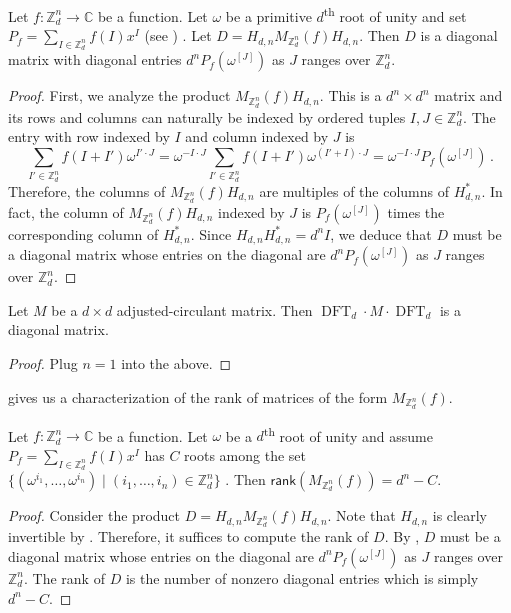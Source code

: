 \documentclass{toc}
\renewcommand\Z{{\mathbb{Z}}}
\renewcommand\C{{\mathbb{C}}}
\newcommand\rank{\textsf{rank}}
\newcommand{\ts}{\textsuperscript}
\DeclareMathOperator{\DFT}{DFT}
\begin{document}
\begin{claim} \label{Hadamard_diagonalization}
Let $f: \Z_d^n \rightarrow \C$ be a function.  Let $\omega$ be a %
primitive  %
%
$d$\ts{th}
%
root of unity and set $P_f = \sum_{I \in \Z_d^n} f(I)x^I$ %
(see )%
.  Let $D = H_{d,n}M_{\Z_d^n}(f)H_{d,n}$.  Then $D$ is a diagonal matrix with diagonal entries $d^nP_f(\omega^{[J]})$ as $J$ ranges over $\Z_d^n$.
\end{claim}
\begin{proof}
First, we analyze the product $M_{\Z_d^n}(f)H_{d,n}$.  This is a $d^n \times d^n$ matrix and its rows and columns can naturally be indexed by ordered tuples $I,J \in \Z_d^n$.  The entry with row indexed by $I$ and column indexed by $J$ is
\[
\sum_{I' \in \Z_d^n} f(I + I')\omega^{I' \cdot J} = \omega^{-I \cdot J}\sum_{I' \in \Z_d^n} f(I + I')\omega^{(I'+I) \cdot J} = \omega^{-I \cdot J} P_f(\omega^{[J]}) \,.
\]
Therefore, the columns of $M_{\Z_d^n}(f)H_{d,n}$ are multiples of the columns of $H_{d,n}^*$.  In fact, the column of $M_{\Z_d^n}(f)H_{d,n}$ indexed by $J$ is $P_f(\omega^{[J]})$ times the corresponding column of $H_{d,n}^*$.  Since $H_{d,n}H_{d,n}^* = d^nI$, %
we deduce that %
$D$ must be a diagonal matrix whose entries on the diagonal are $d^nP_f(\omega^{[J]})$ as $J$ ranges over $\Z_d^n$. 
\end{proof}

\begin{claim}\label{Fourier_diagonalization}
Let $M$ be a $d \times d$ adjusted-circulant matrix.  Then %
$\DFT_d \cdot  M  \cdot \DFT_d$ %
is a diagonal matrix.
\end{claim}
\begin{proof}
Plug $n=1$ into the above.
\end{proof}



 gives us a characterization of the rank of matrices of the form $M_{\Z_d^n}(f)$.
\begin{claim} \label{rankcomp}
Let $f: \Z_d^n \rightarrow \C$ be a function.  Let $\omega$ be a %
$d$\ts{th}
%
root of unity and 
%
assume %
$P_f = \sum_{I \in \Z_d^n} f(I)x^I$ has $C$ roots among the set %
$\{ (\omega^{i_1}, \dots , \omega^{i_n}) \mid (i_1, \dots , i_n) \in \Z_d^n \}$ %
.
Then $\rank(M_{\Z_d^n}(f)) = d^n - C$.
\end{claim}
\begin{proof}
Consider the product $D = H_{d,n}M_{\Z_d^n}(f)H_{d,n}$.  Note that $H_{d,n}$ is clearly invertible by .  Therefore, it suffices to compute the rank of $D$.  By , $D$ must be a diagonal matrix whose entries on the diagonal are $d^nP_f(\omega^{[J]})$ as $J$ ranges over $\Z_d^n$.  The rank of $D$ is the number of nonzero diagonal entries which is simply $d^n - C$.
\end{proof}
\end{document}

